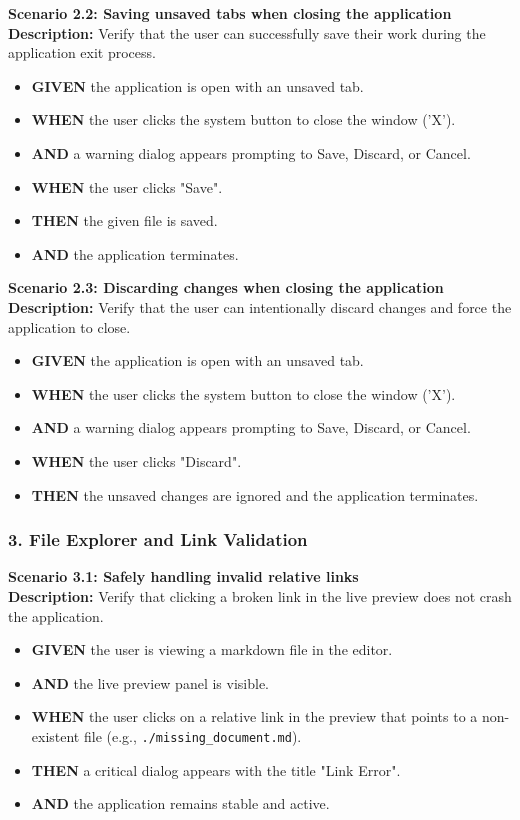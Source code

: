 \documentclass[12pt, a4paper]{article}
\begin{document}
\textbf{Scenario 2.2: Saving unsaved tabs when closing the application} \\
\textbf{Description:} Verify that the user can successfully save their work during the application exit process.
\begin{itemize}
    \item \textbf{GIVEN} the application is open with an unsaved tab.
    \item \textbf{WHEN} the user clicks the system button to close the window ('X').
    \item \textbf{AND} a warning dialog appears prompting to Save, Discard, or Cancel.
    \item \textbf{WHEN} the user clicks "Save".
    \item \textbf{THEN} the given file is saved.
    \item \textbf{AND} the application terminates.
\end{itemize}

\textbf{Scenario 2.3: Discarding changes when closing the application} \\
\textbf{Description:} Verify that the user can intentionally discard changes and force the application to close.
\begin{itemize}
    \item \textbf{GIVEN} the application is open with an unsaved tab.
    \item \textbf{WHEN} the user clicks the system button to close the window ('X').
    \item \textbf{AND} a warning dialog appears prompting to Save, Discard, or Cancel.
    \item \textbf{WHEN} the user clicks "Discard".
    \item \textbf{THEN} the unsaved changes are ignored and the application terminates.
\end{itemize}

\subsubsection*{3. File Explorer and Link Validation}

\textbf{Scenario 3.1: Safely handling invalid relative links} \\
\textbf{Description:} Verify that clicking a broken link in the live preview does not crash the application.
\begin{itemize}
    \item \textbf{GIVEN} the user is viewing a markdown file in the editor.
    \item \textbf{AND} the live preview panel is visible.
    \item \textbf{WHEN} the user clicks on a relative link in the preview that points to a non-existent file (e.g., \texttt{./missing\_document.md}).
    \item \textbf{THEN} a critical dialog appears with the title "Link Error".
    \item \textbf{AND} the application remains stable and active.
\end{itemize}
\end{document}

